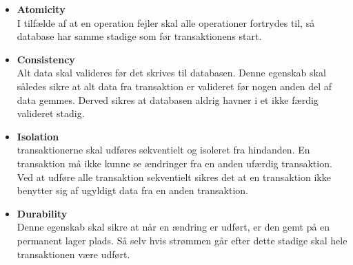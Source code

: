 \begin{itemize}
	\item \textbf{Atomicity} \\
		I tilfælde af at en operation fejler skal alle operationer fortrydes til, så database har samme stadige som før transaktionens start. 

	\item \textbf{Consistency} \\
		Alt data skal valideres før det skrives til databasen. Denne egenskab skal således sikre at alt data fra transaktion er valideret før nogen anden del af data gemmes. Derved sikres at databasen aldrig havner i et ikke færdig valideret stadig.

	\item \textbf{Isolation} \\
		transaktionerne skal udføres sekventielt og isoleret fra hindanden. En transaktion må ikke kunne se ændringer fra en anden ufærdig transaktion. Ved at udføre alle transaktion sekventielt sikres det at en transaktion ikke benytter sig af ugyldigt data fra en anden transaktion.

	\item \textbf{Durability} \\
		Denne egenskab skal sikre at når en ændring er udført, er den gemt på en permanent lager plads.
		Så selv hvis strømmen går efter dette stadige skal hele transaktionen være udført. 


\end{itemize}





